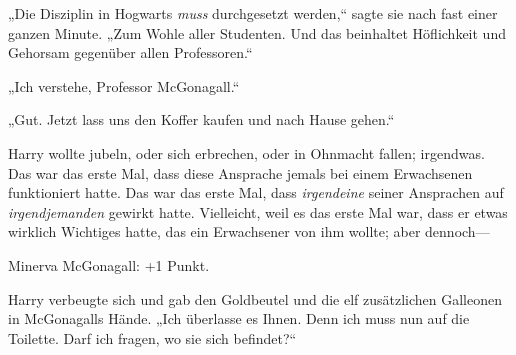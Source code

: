 „Die Disziplin in Hogwarts \emph{muss} durchgesetzt werden,“ sagte sie nach fast einer ganzen Minute. „Zum Wohle aller Studenten. Und das beinhaltet Höflichkeit und Gehorsam gegenüber allen Professoren.“

„Ich verstehe, Professor McGonagall.“

„Gut. Jetzt lass uns den Koffer kaufen und nach Hause gehen.“

Harry wollte jubeln, oder sich erbrechen, oder in Ohnmacht fallen; irgendwas. Das war das erste Mal, dass diese Ansprache jemals bei einem Erwachsenen funktioniert hatte. Das war das erste Mal, dass \emph{irgendeine} seiner Ansprachen auf \emph{irgendjemanden} gewirkt hatte. Vielleicht, weil es das erste Mal war, dass er etwas wirklich Wichtiges hatte, das ein Erwachsener von ihm wollte; aber dennoch—

Minerva McGonagall: +1 Punkt.

Harry verbeugte sich und gab den Goldbeutel und die elf zusätzlichen Galleonen in McGonagalls Hände. „Ich überlasse es Ihnen. Denn ich muss nun auf die Toilette. Darf ich fragen, wo sie sich befindet?“

